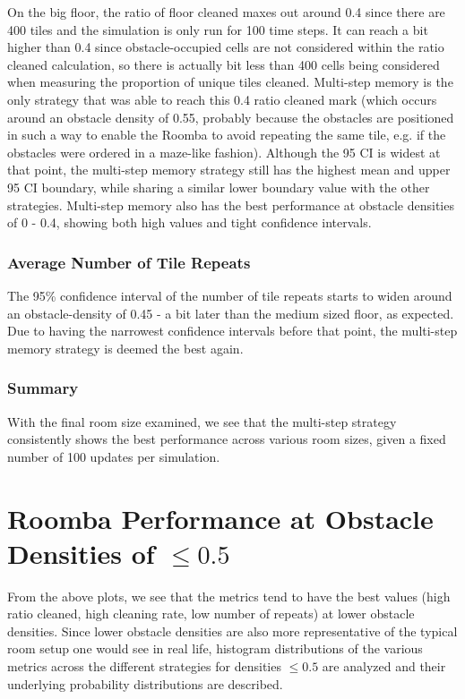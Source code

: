 \documentclass[11pt]{article}
\begin{document}
On the big floor, the ratio of floor cleaned maxes out around 0.4 since
there are 400 tiles and the simulation is only run for 100 time steps.
It can reach a bit higher than 0.4 since obstacle-occupied cells are not
considered within the ratio cleaned calculation, so there is actually
bit less than 400 cells being considered when measuring the proportion
of unique tiles cleaned. Multi-step memory is the only strategy that was
able to reach this 0.4 ratio cleaned mark (which occurs around an
obstacle density of 0.55, probably because the obstacles are positioned
in such a way to enable the Roomba to avoid repeating the same tile,
e.g. if the obstacles were ordered in a maze-like fashion). Although the
95 CI is widest at that point, the multi-step memory strategy still has
the highest mean and upper 95 CI boundary, while sharing a similar lower
boundary value with the other strategies. Multi-step memory also has the
best performance at obstacle densities of 0 - 0.4, showing both high
values and tight confidence intervals.

 \subsubsection*{Average Number of Tile Repeats}

The 95\% confidence interval of the number of tile repeats starts to
widen around an obstacle-density of 0.45 - a bit later than the medium
sized floor, as expected. Due to having the narrowest confidence
intervals before that point, the multi-step memory strategy is deemed
the best again.

 \subsubsection{Summary}

With the final room size examined, we see that the multi-step strategy
consistently shows the best performance across various room sizes, given
a fixed number of 100 updates per simulation.

   \section{ Roomba Performance at Obstacle Densities of \(\leq 0.5\)}

From the above plots, we see that the metrics tend to have the best
values (high ratio cleaned, high cleaning rate, low number of repeats)
at lower obstacle densities. Since lower obstacle densities are also
more representative of the typical room setup one would see in real
life, histogram distributions of the various metrics across the
different strategies for densities \(\leq 0.5\) are analyzed and their
underlying probability distributions are described.
\end{document}
